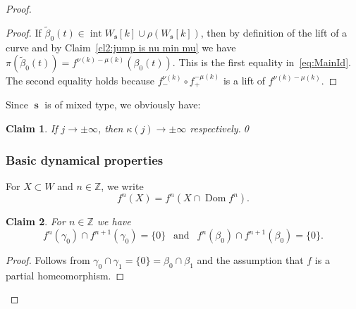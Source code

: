 \documentclass[]{amsart}
\newcommand{\Dom}{\operatorname {Dom}}
\renewcommand{\sp}{{\ \ }}
\newcommand\intr{\operatorname{int}}
\newcommand\seq{{\operatorname{\mathbf s}}}
\newtheorem{claim2}{Claim}
\newcommand{\Z}{\mathbb{Z}}
\theoremstyle{remark}
\numberwithin{equation}{section}
\theoremstyle{definition}
\begin{document}
\begin{proof}
\begin{proof}
If $\widetilde \beta_0(t)\in  {\intr W_\seq [k]\cup \rho(W_\seq [k])}$, then by definition of the lift of a curve and by Claim~\ref{cl2:jump is nu min mu} we have
$\pi(\widetilde \beta_0(t))= f^{\nu(k)-\mu(k)}(\beta_0(t))$. This is the first equality in~\eqref{eq:MainId}. The second equality holds because $f^ {\nu(k)}_-\circ f_+^ {-\mu(k)}$ is a lift of $f^ {\nu(k)-\mu(k)}$.
\end{proof}


Since $\seq$ is of mixed type, we obviously have:
\begin{claim2}
\label{cl2:kappa tens inft}
 If $j \to \pm \infty$, then $\kappa(j)\to \pm\infty$ respectively.\qed
\end{claim2}
 
\subsubsection{Basic dynamical properties} For $X\subset W$ and $n\in \Z$, we write \[f^n(X)=f^n\left( X\cap \Dom f^n\right).\]

\begin{claim2}
\label{cl2:A}
For $n\in \Z$ we have
\[f^n(\gamma_0)\cap f^{n+1}(\gamma_0)=\{0\}\sp \text{ and }\sp f^n(\beta_0)\cap f^{n+1}(\beta_0)=\{0\}.\]
\end{claim2}
\begin{proof}
Follows from $\gamma_0\cap \gamma_1=\{0\}= \beta_0\cap \beta_1$ and the assumption that $f$ is a partial homeomorphism. 
\end{proof}




\end{proof}
\end{document}
